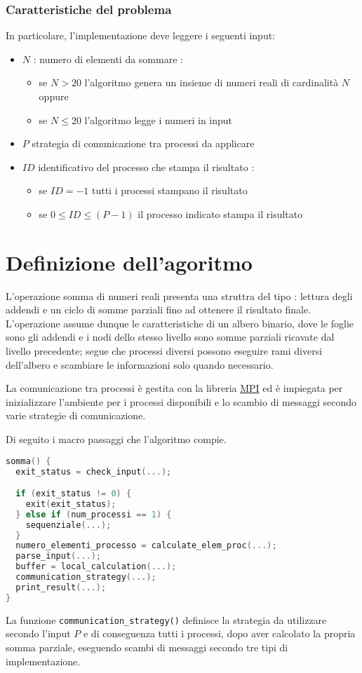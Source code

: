 \documentclass[a4paper,11pt]{book}
\begin{document}
\subsection{Caratteristiche del problema}\label{caratteritiche_problema}
In particolare, l'implementazione deve leggere i seguenti input:
\begin{itemize}
    \item $N$ : numero di elementi da sommare :
    \begin{itemize}
        \item se $N > 20$ l'algoritmo genera un insieme di numeri reali di cardinalità $N$ oppure
        \item se $N \leq 20$ l'algoritmo legge i numeri in input
    \end{itemize}
    \item $P$ strategia di comunicazione tra processi da applicare
    \item $ID$ identificativo del processo che stampa il risultato :
    \begin{itemize}
        \item se $ID = -1$ tutti i processi stampano il risultato
        \item se $0 \leq ID \leq (P - 1)$ il processo indicato stampa il risultato
    \end{itemize} 
\end{itemize}
\chapter{Definizione dell'agoritmo}
L'operazione somma di numeri reali presenta una struttra del tipo : lettura degli addendi e un ciclo di somme parziali fino ad ottenere il risultato finale. L'operazione assume dunque le caratteristiche di un albero binario, dove le foglie sono gli addendi e i nodi dello stesso livello sono somme parziali ricavate dal livello precedente; segue che processi diversi possono eseguire rami diversi dell'albero e scambiare le informazioni solo quando necessario. \par 
La comunicazione tra processi è gestita con la libreria \underline{MPI} ed è impiegata per inizializzare l'ambiente per i processi disponibili e lo scambio di messaggi secondo varie strategie di comunicazione. \par 
Di seguito i macro passaggi che l'algoritmo compie.
 \begin{lstlisting}[language=C]
somma() {
  exit_status = check_input(...);

  if (exit_status != 0) {
    exit(exit_status);
  } else if (num_processi == 1) {
    sequenziale(...);
  }
  numero_elementi_processo = calculate_elem_proc(...);
  parse_input(...);
  buffer = local_calculation(...);
  communication_strategy(...);
  print_result(...);
}
\end{lstlisting}
La funzione \verb|communication_strategy()| definisce la strategia da utilizzare secondo l'input $P$ e di conseguenza tutti i processi, dopo aver calcolato la propria somma parziale, eseguendo scambi di messaggi secondo tre tipi di implementazione.
\end{document}
